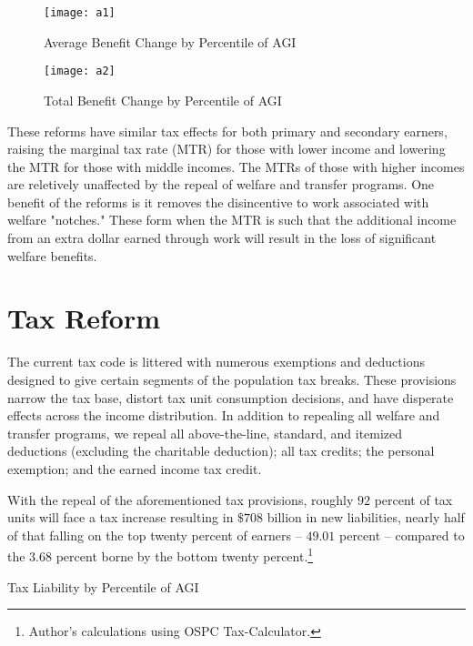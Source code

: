 \documentclass{article}
\begin{document}
\begin{figure}[H]
\begin{center}
\caption{Average Benefit Change by Percentile of AGI}
\texttt{[image: a1]}
\end{center}
\end{figure}

\begin{figure}[H]
\centering
\caption{Total Benefit Change by Percentile of AGI}
\texttt{[image: a2]}
\end{figure}

These reforms have similar tax effects for both primary and secondary earners, raising the marginal tax rate (MTR) for those with lower income and lowering the MTR for those with middle incomes. The MTRs of those with higher incomes are reletively unaffected by the repeal of welfare and transfer programs. One benefit of the reforms is it removes the disincentive to work associated with welfare "notches." These form when the MTR is such that the additional income from an extra dollar earned through work will result in the loss of significant welfare benefits.

\section{Tax Reform}
The current tax code is littered with numerous exemptions and deductions designed to give certain segments of the population tax breaks. These provisions narrow the tax base, distort tax unit consumption decisions, and have disperate effects across the income distribution.  In addition to repealing all welfare and transfer programs, we repeal all above-the-line, standard, and itemized deductions (excluding the charitable deduction); all tax credits; the personal exemption; and the earned income tax credit.

With the repeal of the aforementioned tax provisions, roughly $92$ percent of tax units will face a tax increase resulting in $\$708$ billion in new liabilities, nearly half of that falling on the top twenty percent of earners -- $49.01$ percent -- compared to the $3.68$ percent borne by the bottom twenty percent.\footnote{Author’s calculations using OSPC Tax-Calculator.}

\begin{table}[H]
\caption{Tax Liability by Percentile of AGI}
\begin{center}
\begin{adjustbox}{max width=\textwidth}

\end{adjustbox}
\end{center}
\end{table}
\end{document}
